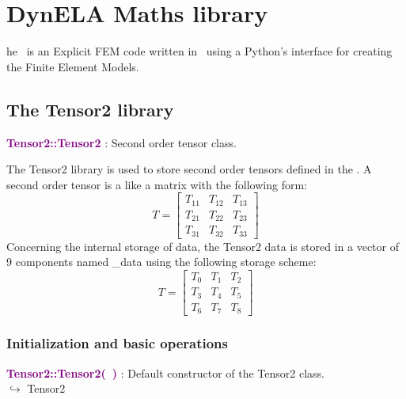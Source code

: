 %
%
%
\chapter{DynELA Maths library}

\startcontents[chapters]
\printmyminitoc[2]he \DynELA~is an Explicit FEM code written in \Cpp~using a Python's interface for creating the Finite Element Models. 

\section{The Tensor2 library}

\textcolor{purple}{\textbf{Tensor2::Tensor2}}\label{Tensor2::Tensor2} : Second order tensor class.

The Tensor2 library is used to store second order tensors defined in the \DynELA. A second order tensor is a like a matrix with the following form:
\begin{equation*}
T=\left[\begin{array}{ccc}
  T_{11} & T_{12} & T_{13}\\
  T_{21} & T_{22} & T_{23}\\
  T_{31} & T_{32} & T_{33}
  \end{array}\right]
\end{equation*}
Concerning the internal storage of data, the Tensor2 data is stored in a vector of 9 components named \_data using the following storage scheme:
\begin{equation*}
T=\left[\begin{array}{ccc}
    T_{0} & T_{1} & T_{2}\\
    T_{3} & T_{4} & T_{5}\\
    T_{6} & T_{7} & T_{8}
    \end{array}\right]
\end{equation*}

\subsection{Initialization and basic operations}
\textcolor{purple}{\textbf{Tensor2::Tensor2(~)}}\label{Tensor2::Tensor2()} : Default constructor of the Tensor2 class.\\ \hspace*{5mm}$\hookrightarrow$ Tensor2

